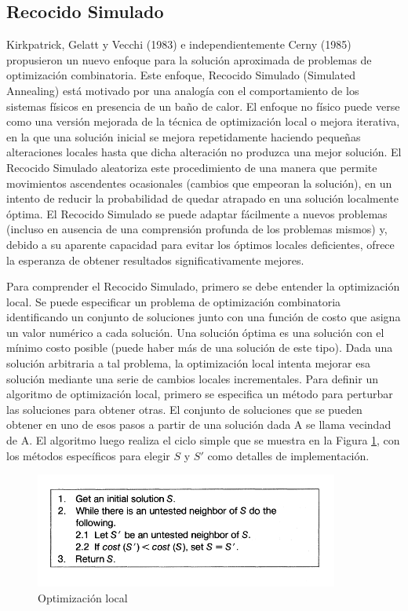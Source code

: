 \documentclass[a4paper,12pt]{book}
\begin{document}
	\subsection{Recocido Simulado}
		Kirkpatrick, Gelatt y Vecchi (1983) e independientemente Cerny (1985) propusieron un nuevo enfoque para la solución aproximada de problemas de optimización combinatoria. Este enfoque, Recocido Simulado \cite{RecocidoSimulado} (Simulated Annealing) está motivado por una analogía con el comportamiento de los sistemas físicos en presencia de un baño de calor. El enfoque no físico puede verse como una versión mejorada de la técnica de optimización local o mejora iterativa, en la que una solución inicial se mejora repetidamente haciendo pequeñas alteraciones locales hasta que dicha alteración no produzca una mejor solución. El Recocido Simulado aleatoriza este procedimiento de una manera que permite movimientos ascendentes ocasionales (cambios que empeoran la solución), en un intento de reducir la probabilidad de quedar atrapado en una solución localmente óptima. El Recocido Simulado se puede adaptar fácilmente a nuevos problemas (incluso en ausencia de una comprensión profunda de los problemas mismos) y, debido a su aparente capacidad para evitar los óptimos locales deficientes, ofrece la esperanza de obtener resultados significativamente mejores.
		
		Para comprender el Recocido Simulado, primero se debe entender la optimización local. Se puede especificar un problema de optimización combinatoria identificando un conjunto de soluciones junto con una función de costo que asigna un valor numérico a cada solución. Una solución óptima es una solución con el mínimo costo posible (puede haber más de una solución de este tipo). Dada una solución arbitraria a tal problema, la optimización local intenta mejorar esa solución mediante una serie de cambios locales incrementales. Para definir un algoritmo de optimización local, primero se especifica un método para perturbar las soluciones para obtener otras. El conjunto de soluciones que se pueden obtener en uno de esos pasos a partir de una solución dada A se llama vecindad de A. El algoritmo luego realiza el ciclo simple que se muestra en la Figura \ref{OptLocalRS}, con los métodos específicos para elegir $S$ y $S'$ como detalles de implementación.
		
		\begin{figure}[h]
		\centering
		\includegraphics[width=10cm]{./Graphics/RecocidoSimuladoOptLocal.png}
		\caption{Optimización local}
		\label{OptLocalRS}
		\end{figure}
		
\end{document}
